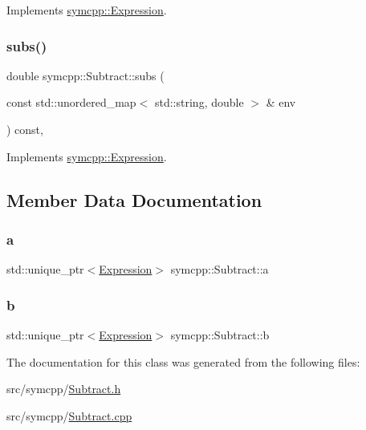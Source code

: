 Implements \mbox{\hyperlink{classsymcpp_1_1Expression_ab1fa6e55eea0682250d013f28db26cd2}{symcpp\+::\+Expression}}.

\mbox{\label{classsymcpp_1_1Subtract_a35a24632dfacadb23e4177a539e7c1df}} 
\subsubsection{\texorpdfstring{subs()}{subs()}}
{\footnotesize\ttfamily double symcpp\+::\+Subtract\+::subs (\begin{DoxyParamCaption}\item[{const std\+::unordered\+\_\+map$<$ std\+::string, double $>$ \&}]{env }\end{DoxyParamCaption}) const\hspace{0.3cm}{\ttfamily [override]}, {\ttfamily [virtual]}}



Implements \mbox{\hyperlink{classsymcpp_1_1Expression_aaef29b0afa2d6c21fe35f47a1be76134}{symcpp\+::\+Expression}}.



\subsection{Member Data Documentation}
\mbox{\label{classsymcpp_1_1Subtract_a3ef44b38ab098faab493079d994d35ba}} 
\subsubsection{\texorpdfstring{a}{a}}
{\footnotesize\ttfamily std\+::unique\+\_\+ptr$<$\mbox{\hyperlink{classsymcpp_1_1Expression}{Expression}}$>$ symcpp\+::\+Subtract\+::a\hspace{0.3cm}{\ttfamily [private]}}

\mbox{\label{classsymcpp_1_1Subtract_ac5c9bd87c3554a20d9bf12f5a53a9613}} 
\subsubsection{\texorpdfstring{b}{b}}
{\footnotesize\ttfamily std\+::unique\+\_\+ptr$<$\mbox{\hyperlink{classsymcpp_1_1Expression}{Expression}}$>$ symcpp\+::\+Subtract\+::b\hspace{0.3cm}{\ttfamily [private]}}



The documentation for this class was generated from the following files\+:\begin{DoxyCompactItemize}
\item 
src/symcpp/\mbox{\hyperlink{Subtract_8h}{Subtract.\+h}}\item 
src/symcpp/\mbox{\hyperlink{Subtract_8cpp}{Subtract.\+cpp}}\end{DoxyCompactItemize}
